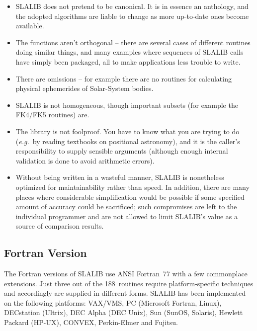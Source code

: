 \documentclass[11pt,twoside,nolof]{starlink}
\providecommand{\nroutines} {188}
\begin{document}
\begin{itemize}
\item SLALIB does not pretend to be canonical.  It is in essence
an anthology, and the adopted algorithms are liable
to change as more up-to-date ones become available.
\item The functions aren't orthogonal -- there are several
cases of different
routines doing similar things, and many examples where
sequences of SLALIB calls have simply been packaged, all to
make applications less trouble to write.
\item There are omissions -- for example there are no
routines for calculating physical ephemerides of
Solar-System bodies.
\item SLALIB is not homogeneous, though important subsets
(for example the FK4/FK5 routines) are.
\item The library is not foolproof.  You have to know what
you are trying to do (\textit{e.g.}\ by reading textbooks on positional
astronomy), and it is the caller's responsibility to supply
sensible arguments (although enough internal validation is done to
avoid arithmetic errors).
\item Without being written in a wasteful
manner, SLALIB is nonetheless optimized for maintainability
rather than speed.  In addition, there are many places
where considerable simplification would be possible if some
specified amount of accuracy could be sacrificed;  such
compromises are left to the individual programmer and
are not allowed to limit SLALIB's value as a source
of comparison results.
\end{itemize}

\subsection{Fortran Version}
The Fortran versions of SLALIB use ANSI Fortran~77 with a few
commonplace extensions.  Just three out of the \nroutines\ routines require
platform-specific techniques and accordingly are supplied
in different forms.
SLALIB has been implemented on the following platforms:
VAX/VMS,
PC (Microsoft Fortran, Linux),
DECstation (Ultrix),
DEC Alpha (DEC Unix),
Sun (SunOS, Solaris),
Hewlett Packard (HP-UX),
CONVEX,
Perkin-Elmer and
Fujitsu.
\end{document}
